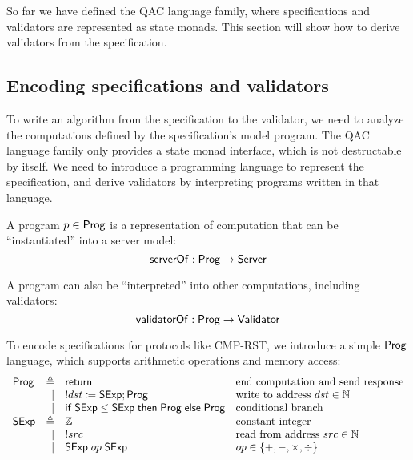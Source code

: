 So far we have defined the QAC language family, where specifications and
validators are represented as state monads.  This section will show how to
derive validators from the specification.

\subsection{Encoding specifications and validators}
\label{sec:proglang}
To write an algorithm from the specification to the validator, we need to
analyze the computations defined by the specification's model program.  The QAC
language family only provides a state monad interface, which is not destructable
by itself.  We need to introduce a programming language to represent the
specification, and derive validators by interpreting programs written in that
language.

\begin{definition}
  A program $p\in\mathsf{Prog}$ is a representation of computation that can be
  ``instantiated'' into a server model:
  \[\mathsf{serverOf}:\mathsf{Prog}\to\mathsf{Server}\]
  
  A program can also be ``interpreted'' into other computations, including
  validators:
  \[\mathsf{validatorOf}:\mathsf{Prog}\to\mathsf{Validator}\]
\end{definition}
To encode specifications for protocols like CMP-RST, we introduce a simple
$\mathsf{Prog}$ language, which supports arithmetic operations and memory access:
\[\begin{array}{lrll}
\Prog&\triangleq&\Return&\text{end computation and send response}\\
&\mid&!dst\coloneqq\Sexp;\Prog&\text{write to address }dst\in\Nat\\\null
&\mid&\If\Sexp\le\Sexp\Then\Prog\Else\Prog&\text{conditional branch}\\
\Sexp&\triangleq&\Int&\text{constant integer}\\
&\mid&!src&\text{read from address }src\in\Nat\\
&\mid&\Sexp\;op\;\Sexp&op\in\{+,-,\times,\div\}
\end{array}
\]

